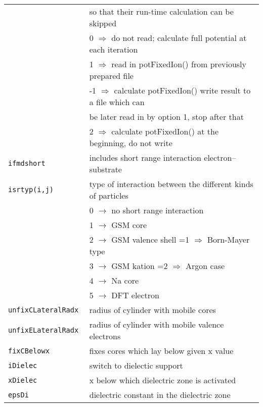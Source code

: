 \documentclass[12pt]{article}
\begin{document}
\begin{tabular}{ll}
   &  so that their run-time calculation can be skipped\\
   &   0 $\Longrightarrow$ do not read; calculate full potential at each iteration\\
   &   1 $\Longrightarrow$ read in potFixedIon() from previously prepared file\\
   &  -1 $\Longrightarrow$ calculate potFixedIon() write result to a file which can\\
   &\qquad  be later read in by option 1, stop after that\\
   &   2 $\Longrightarrow$ calculate potFixedIon() at the beginning, do not write\\
{\tt ifmdshort} & includes short range interaction electron--substrate\\
{\tt isrtyp(i,j)      }& type of interaction between the different kinds of particles\\
{\tt                  }& 0   $\rightarrow$ no short range interaction\\
{\tt                  }& 1   $\rightarrow$ GSM core\\
{\tt                  }& 2   $\rightarrow$ GSM valence shell    =1 $\Longrightarrow$ Born-Mayer type\\
{\tt                  }& 3   $\rightarrow$ GSM kation                   =2 $\Longrightarrow$ Argon case\\
{\tt                  }& 4   $\rightarrow$ Na core\\
{\tt                  }& 5   $\rightarrow$ DFT electron\\
{\tt unfixCLateralRadx  }& radius of cylinder with mobile cores \\
{\tt unfixELateralRadx  }& radius of cylinder with mobile valence electrons\\
{\tt fixCBelowx       }&   fixes cores which lay below given x value\\
{\tt iDielec          }& switch to dielectic support\\
{\tt xDielec          }& x below which dielectric zone is activated\\
{\tt epsDi            }& dielectric constant in the dielectric zone\\
\hline
\end{tabular}
\end{document}
